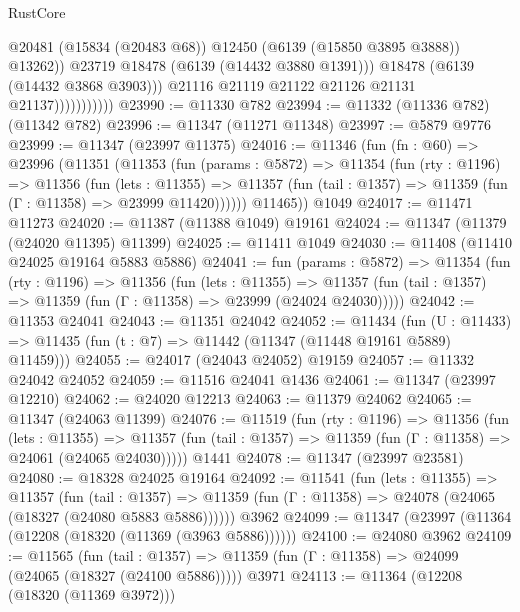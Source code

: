 \begin{lexlean}{RustCore}
\begin{coremodule}
                                  @20481
                                  (@15834 (@20483 @68))
                                  @12450
                                  (@6139 (@15850 @3895 @3888))
                                  @13262))
                              @23719
                              @18478
                              (@6139 (@14432 @3880 @1391)))
                            @18478
                            (@6139 (@14432 @3868 @3903)))
                          @21116
                          @21119
                          @21122
                          @21126
                          @21131
                          @21137)))))))))))
@23990 := @11330 @782
@23994 := @11332 (@11336 @782) (@11342 @782)
@23996 := @11347 (@11271 @11348)
@23997 := @5879 @9776
@23999 := @11347 (@23997 @11375)
@24016 := @11346
    (fun (fn : @60) =>
    @23996
      (@11351
        (@11353
          (fun (params : @5872) =>
          @11354
            (fun (rty : @1196) =>
            @11356
              (fun (lets : @11355) =>
              @11357 (fun (tail : @1357) => @11359 (fun (Γ : @11358) => @23999 @11420))))))
        @11465))
    @1049
@24017 := @11471 @11273
@24020 := @11387 (@11388 @1049) @19161
@24024 := @11347 (@11379 (@24020 @11395) @11399)
@24025 := @11411 @1049
@24030 := @11408 (@11410 @24025 @19164 @5883 @5886)
@24041 := fun (params : @5872) =>
  @11354
    (fun (rty : @1196) =>
    @11356
      (fun (lets : @11355) =>
      @11357 (fun (tail : @1357) => @11359 (fun (Γ : @11358) => @23999 (@24024 @24030)))))
@24042 := @11353 @24041
@24043 := @11351 @24042
@24052 := @11434
    (fun (U : @11433) => @11435 (fun (t : @7) => @11442 (@11347 (@11448 @19161 @5889) @11459)))
@24055 := @24017 (@24043 @24052) @19159
@24057 := @11332 @24042 @24052
@24059 := @11516 @24041 @1436
@24061 := @11347 (@23997 @12210)
@24062 := @24020 @12213
@24063 := @11379 @24062
@24065 := @11347 (@24063 @11399)
@24076 := @11519
    (fun (rty : @1196) =>
    @11356
      (fun (lets : @11355) =>
      @11357 (fun (tail : @1357) => @11359 (fun (Γ : @11358) => @24061 (@24065 @24030)))))
    @1441
@24078 := @11347 (@23997 @23581)
@24080 := @18328 @24025 @19164
@24092 := @11541
    (fun (lets : @11355) =>
    @11357
      (fun (tail : @1357) =>
      @11359 (fun (Γ : @11358) => @24078 (@24065 (@18327 (@24080 @5883 @5886))))))
    @3962
@24099 := @11347 (@23997 (@11364 (@12208 (@18320 (@11369 (@3963 @5886))))))
@24100 := @24080 @3962
@24109 := @11565
    (fun (tail : @1357) => @11359 (fun (Γ : @11358) => @24099 (@24065 (@18327 (@24100 @5886)))))
    @3971
@24113 := @11364 (@12208 (@18320 (@11369 @3972)))

\end{coremodule}
\end{lexlean}
